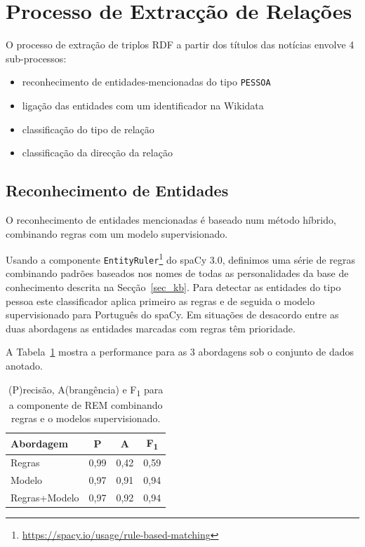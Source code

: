 \documentclass[a4paper, twocolumn, 11pt, twoside]{article}
\begin{document}
\section{Processo de Extracção de Relações}
\label{sec:classifiers}

O processo de extração de triplos RDF a partir dos títulos das notícias envolve 4 sub-processos:

\begin{itemize}
\item reconhecimento de entidades-mencionadas do tipo \texttt{PESSOA}
\item ligação das entidades com um identificador na Wikidata
\item classificação do tipo de relação
\item classificação da direcção da relação
\end{itemize}

\subsection{Reconhecimento de Entidades}
\label{subsec:ner}


O reconhecimento de entidades mencionadas é baseado num método híbrido, combinando regras com um modelo supervisionado.

Usando a componente \texttt{EntityRuler}\footnote{\url{https://spacy.io/usage/rule-based-matching}} do spaCy 3.0, definimos uma série de regras combinando padrões baseados nos nomes de todas as personalidades da base de conhecimento descrita na Secção~\ref{sec_kb}. Para detectar as entidades do tipo pessoa este classificador aplica primeiro as regras e de seguida o modelo supervisionado para Português do spaCy. Em situações de desacordo entre as duas abordagens as entidades marcadas com regras têm prioridade.

A Tabela~\ref{tab:results_ner} mostra a performance para as 3 abordagens sob o conjunto de dados anotado.


\begin{table}[!h]
    \begin{center}
    \begin{tabular}{l ccc}
		{\bf Abordagem}  & {\bf P} & {\bf A} & {\bf F\textsubscript{1}} \\
        \hline
        Regras           &  0,99     &  0,42     & 		0,59		\\
        Modelo           &  0,97     &  0,91     & 		0,94		\\
		Regras+Modelo    &  0,97     &  0,92     & 		0,94		\\
    \end{tabular}
	\caption{ (P)recisão, A(brangência) e F\textsubscript{1} para a componente de REM combinando regras e o modelos supervisionado.}	
	\label{tab:results_ner}
	\end{center}
\end{table}
\end{document}
